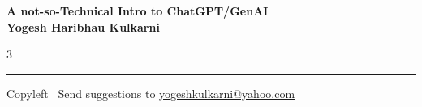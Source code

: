 \documentclass[8pt,landscape]{article}
\begin{document}
\footnotesize


\begin{center}
\Large{\textbf{A not-so-Technical Intro to ChatGPT/GenAI\\ Yogesh Haribhau Kulkarni}}
\end{center}

\begin{multicols}{3}

\end{multicols}

\rule{\linewidth}{0.25pt}
\scriptsize
Copyleft \textcopyleft\  Send suggestions to
\href{http://www.yogeshkulkarni.com}{yogeshkulkarni@yahoo.com}
\end{document}

